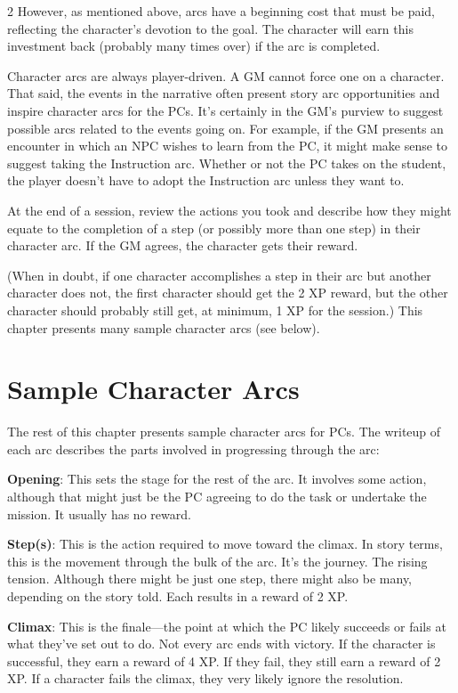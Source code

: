 \begin{multicols}{2}
However, as mentioned above, arcs have a beginning cost that must be paid, reflecting the character’s devotion to the goal. The character will earn this investment back (probably many times over) if the arc is completed. 

Character arcs are always player-driven. A GM cannot force one on a character. That said, the events in the narrative often present story arc opportunities and inspire character arcs for the PCs. It’s certainly in the GM’s purview to suggest possible arcs related to the events going on. For example, if the GM presents an encounter in which an NPC wishes to learn from the PC, it might make sense to suggest taking the Instruction arc. Whether or not the PC takes on the student, the player doesn’t have to adopt the Instruction arc unless they want to.

At the end of a session, review the actions you took and describe how they might equate to the completion of a step (or possibly more than one step) in their character arc. If the GM agrees, the character gets their reward.

(When in doubt, if one character accomplishes a step in their arc but another character does not, the first character should get the 2 XP reward, but the other character should probably still get, at minimum, 1 XP for the session.)
This chapter presents many sample character arcs (see below).

\section{Sample Character Arcs}

The rest of this chapter presents sample character arcs for PCs. The writeup of each arc describes the parts involved in progressing through the arc:

\textbf{Opening}: This sets the stage for the rest of the arc. It involves some action, although that might just be the PC agreeing to do the task or undertake the mission. It usually has no reward.

\textbf{Step(s)}: This is the action required to move toward the climax. In story terms, this is the movement through the bulk of the arc. It’s the journey. The rising tension. Although there might be just one step, there might also be many, depending on the story told. Each results in a reward of 2 XP.

\textbf{Climax}: This is the finale—the point at which the PC likely succeeds or fails at what they’ve set out to do. Not every arc ends with victory. If the character is successful, they earn a reward of 4 XP. If they fail, they still earn a reward of 2 XP. If a character fails the climax, they very likely ignore the resolution.


\end{multicols}
